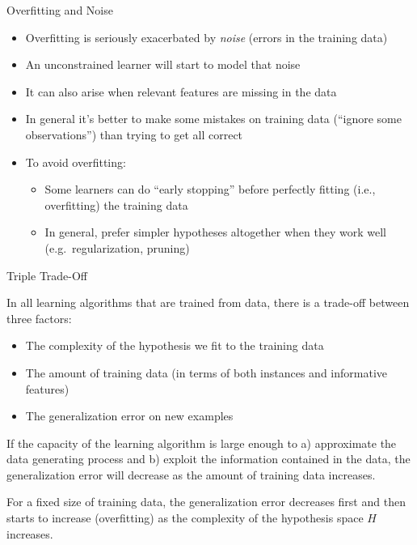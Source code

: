 \begin{frame}{Overfitting and Noise}

\begin{itemize}
\item
  Overfitting is seriously exacerbated by \emph{noise} (errors in the
  training data)
\item
  An unconstrained learner will start to model that noise
\item
  It can also arise when relevant features are missing in the data
\item
  In general it's better to make some mistakes on training data
  (\enquote{ignore some observations}) than trying to get all correct
\item
  To avoid overfitting:  
  \begin{itemize}
    \item
      Some learners can do \enquote{early stopping} before perfectly fitting
      (i.e., overfitting) the training data
    \item
      In general, prefer simpler hypotheses altogether when they work well
      (e.g.~regularization, pruning)
  \end{itemize}
\end{itemize}

\end{frame}

\begin{frame}{Triple Trade-Off}

In all learning algorithms that are trained from data, there is a
trade-off between three factors:

\begin{itemize}
\item
  The complexity of the hypothesis we fit to the training data
\item
  The amount of training data (in terms of both instances and
  informative features)
\item
  The generalization error on new examples
\end{itemize}

If the capacity of the learning algorithm is large enough to a)
approximate the data generating process and b) exploit the information
contained in the data, the generalization error will decrease as the
amount of training data increases.

For a fixed size of training data, the generalization error decreases
first and then starts to increase (overfitting) as the complexity of the
hypothesis space \(H\) increases.

\end{frame}

